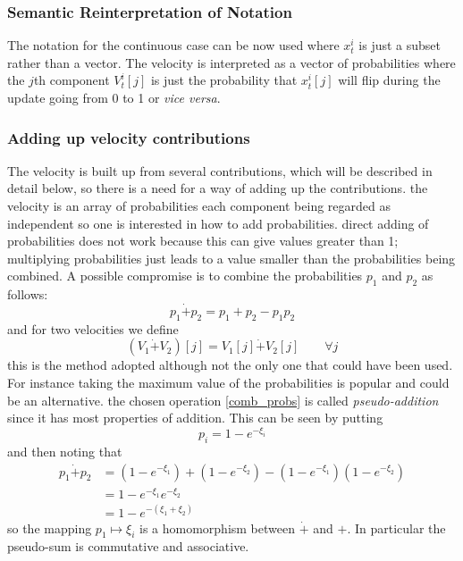 \documentclass[a4paper,oneside,english]{book}
\numberwithin{equation}{section}
\numberwithin{figure}{section}
\begin{document}
\subsubsection{Semantic Reinterpretation of Notation }
The notation for the continuous case can be now used where $x_t^i$ is just a subset rather than a vector. The velocity is interpreted as a vector of probabilities  where the $j$th component $V_t^i[j]$ is just the probability that $x_t^i[j]$ will flip during the update going from 0 to 1 or \textit{vice versa}.
\subsubsection{Adding up velocity contributions}
The velocity is built up from several contributions, which will be described in detail below, so there is a need for a way of adding up the contributions. the velocity is an array of probabilities each component being regarded as independent so one is interested in how to add probabilities. direct adding of probabilities does not work because this can give values greater than 1; multiplying probabilities just leads to a value smaller  than the probabilities being combined. A possible compromise is to combine the probabilities  $p_1$ and $p_2$ as follows:
\begin{equation}\label{comb_probs}
p_1\dot{+}p_2= p_1+p_2-p_1p_2
\end{equation}
and for two velocities we define
\begin{equation}\label{vel-add}
(V_1\dot{+}V_2)[j]=V_1[j]\dot{+}V_2[j] \qquad \forall j
\end{equation}       
this is the method adopted although not the only one that could have been used. For instance taking the maximum value of the probabilities is popular and could be an alternative. the chosen operation \eqref{comb_probs} is called \emph{pseudo-addition} since it has most properties of addition. This can be seen  by putting 
\begin{equation}\label{add-map}
p_i=1-e^{-\xi_i}
\end{equation}
and then noting that
\begin{align}
p_1\dot{+}p_2&=(1-e^{-\xi_1})+(1-e^{-\xi_2})-(1-e^{-\xi_1})(1-e^{-\xi_2})\\
&=1-e^{-\xi_1}e^{-\xi_2}\\
&=1-e^{-(\xi_1+\xi_2)}
\end{align} 
so the mapping $p_1 \mapsto \xi_i$ is a homomorphism between $\dot{+}$ and  $+$. In particular the pseudo-sum is commutative and associative.
\end{document}
